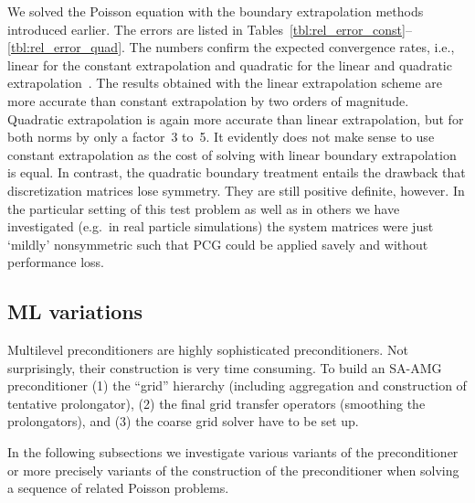 We solved the Poisson equation with the boundary extrapolation methods
introduced earlier.  The errors are listed in
Tables~\ref{tbl:rel_error_const}--\ref{tbl:rel_error_quad}.  The numbers
confirm the expected convergence rates, i.e., linear for the constant
extrapolation and quadratic for the linear and quadratic
extrapolation~\cite{joma:05}.  The results obtained with the
linear extrapolation scheme are more accurate than constant
extrapolation by two orders of magnitude.  Quadratic extrapolation is
again more accurate than linear extrapolation, but for both norms by
only a factor~3 to~5.  It evidently does not make sense to use constant
extrapolation as the cost of solving with linear boundary extrapolation
is equal.  In contrast, the quadratic boundary treatment entails the
drawback that discretization matrices lose symmetry.  They are still
positive definite, however.  In the particular setting of this test
problem as well as in others we have investigated (e.g.\ in real
particle simulations) the system matrices were just `mildly'
nonsymmetric such that PCG could be applied savely and without
performance loss.



\subsection{ML variations}\label{sec:ml_var}

Multilevel preconditioners are highly sophisticated preconditioners.
Not surprisingly, their construction is very time consuming.  To build
an SA-AMG preconditioner (1) the ``grid'' hierarchy (including
aggregation and construction of tentative prolongator), (2) the final
grid transfer operators (smoothing the prolongators), and (3) the coarse
grid solver have to be set up.

In the following subsections we investigate various variants of the
preconditioner or more precisely variants of the construction of the
preconditioner when solving a sequence of related Poisson problems.

